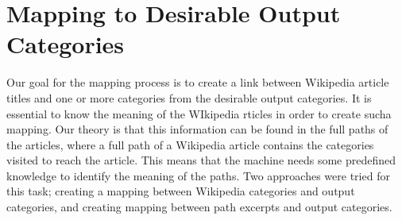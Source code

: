 \section{Mapping to Desirable Output Categories}
Our goal for the mapping process is to create a link between Wikipedia article titles and one or more categories from the desirable output categories. It is essential to know the meaning of the WIkipedia rticles in order to create sucha mapping. Our theory is that this information can be found in the full paths of the articles, where a 
full path of a Wikipedia article contains the categories visited to reach the article. This means that the  machine needs some predefined knowledge to identify the meaning of the paths. Two approaches were tried for this task; creating a mapping between Wikipedia categories and output categories, and creating mapping between path excerpts and output categories. 





